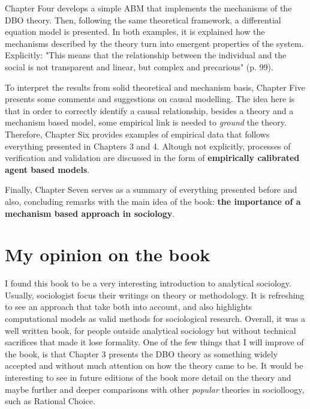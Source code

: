 \documentclass[11pt]{article}
\begin{document}
Chapter Four develops a simple ABM that implements the mechanisms of the DBO theory. Then, following the same theoretical framework, a differential equation model is presented. In both examples, it is explained how the mechanisms described by the theory turn into emergent properties of the system. Explicitly: "This means that the relationship between the individual and the social is not transparent and linear, but complex and precarious" (p. 99).

To interpret the results from solid theoretical and mechanism basis, Chapter Five presents some comments and suggestions on causal modelling. The idea here is that in order to correctly identify a causal relationship, besides a theory and a mechanism based model, some empirical link is needed to \emph{ground} the theory. Therefore, Chapter Six provides examples of empirical data  that follows everything presented in Chapters 3 and 4. Altough not explicitly, processes of verification and validation are discussed in the form of \textbf{empirically calibrated agent based models}.

Finally, Chapter Seven serves as a summary of everything presented before and also, concluding remarks with the main idea of the book: \textbf{the importance of a mechanism based approach in sociology}.

\section*{My opinion on the book}
\label{sec:org5a780d6}
I found this book to be a very interesting introduction to analytical sociology. Usually, sociologist focus their writings on theory or methodology. It is refreshing to see an approach that take both into account, and also highlights computational models as valid methods for sociological research. Overall, it was a well written book, for people outside analytical sociology but without technical sacrifices that made it lose formality. One of the few things that I will improve of the book, is that Chapter 3 presents the DBO theory as something widely accepted and without much attention on how the theory came to be. It would be interesting to see in future editions of the book more detail on the theory and maybe further and deeper comparisons with other \emph{popular} theories in sociolloogy, such as Rational Choice.






\end{document}
